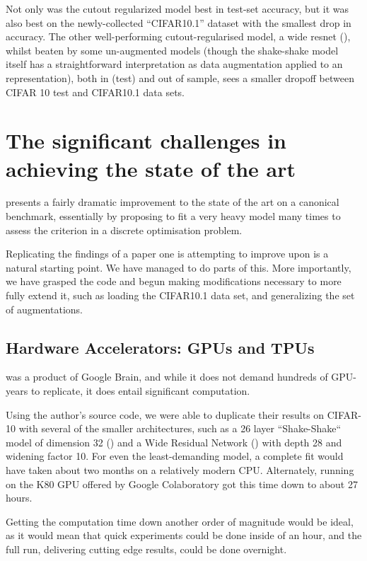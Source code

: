 \documentclass[10pt,twocolumn,letterpaper]{article}
\begin{document}
Not only was the cutout regularized model best in test-set accuracy, but it was also best on the newly-collected ``CIFAR10.1'' dataset with the smallest drop in accuracy. The other well-performing cutout-regularised model, a wide resnet (\cite{Zagoruyko2016}), whilst beaten by some un-augmented models (though the shake-shake model itself has a straightforward interpretation as data augmentation applied to an representation), both in (test) and out of sample, sees a smaller dropoff between CIFAR 10 test and CIFAR10.1 data sets. 

\section{The significant challenges in achieving the state of the art}
\cite{Cubuk2018} presents a fairly dramatic improvement to the state of the art on a canonical benchmark, essentially by proposing to fit a very heavy model many times to assess the criterion in a discrete optimisation problem. 

Replicating the findings of a paper one is attempting to improve upon is a natural starting point. We have managed to do parts of this. More importantly, we have grasped the code and begun making modifications necessary to more fully extend it, such as loading the CIFAR10.1 data set, and generalizing the set of augmentations.

\subsection{Hardware Accelerators: GPUs and TPUs}
\cite{Cubuk2018} was a product of Google Brain, and while it does not demand hundreds of GPU-years to replicate, it does entail significant computation.

Using the author's source code, we were able to duplicate their results on CIFAR-10 with several of the smaller architectures, such as a 26 layer ``Shake-Shake`` model of dimension 32 (\cite{Gastaldi2017}) and a Wide Residual Network (\cite{Zagoruyko2016}) with depth 28 and widening factor 10.
For even the least-demanding model, a complete fit would have taken about two months on a relatively modern CPU. Alternately, running on the K80 GPU offered by Google Colaboratory got this time down to about 27 hours.

Getting the computation time down another order of magnitude would be ideal, as it would mean that quick experiments could be done inside of an hour, and the full run, delivering cutting edge results, could be done overnight.
\end{document}
